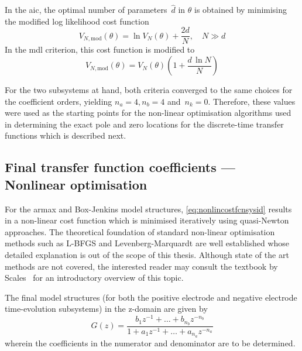 In  the \gls{aic},  the  optimal  number of  parameters~$\hat{d}$ in  $\theta$
is  obtained   by  minimising   the  modified   log  likelihood   cost  function
\begin{equation}
    V_{N,\text{mod}}(\theta) =  \ln V_N(\theta)  + \frac{2  d}{N}, \quad N \gg d
\end{equation}
In the \gls{mdl} criterion, this cost function is modified to
\begin{equation}
    V_{N,\text{mod}}(\theta) =  V_N(\theta)\left(1 + \frac{d\, \ln N}{N}  \right)
\end{equation}

For the two subsystems at hand, both  criteria converged to the same choices for
the coefficient orders,  yielding ${n_a = 4,  n_b = 4}$ and~${n_k  = 0}$. Therefore,
these values  were used as the  starting points for the  non-linear optimisation
algorithms  used in  determining  the  exact pole  and  zero  locations for  the
discrete-time transfer functions which is described next.

\subsection{Final transfer function coefficients --- Nonlinear optimisation}

For         the         \gls{armax}        and         Box-Jenkins         model
structures, \cref{eq:nonlincostfcnsysid} results  in a non-linear  cost function
which  is  minimised iteratively  using  quasi-Newton  approaches. The  theoretical
foundation  of  standard non-linear  optimisation  methods  such as  L-BFGS  and
Levenberg-Marquardt are  well established whose  detailed explanation is  out of
the scope of this thesis. Although state of the art methods are not covered, the
interested reader  may consult the  textbook by Scales~\cite{Scales1985}  for an
introductory overview of this topic.

The  final  model structures  (for  both  the  positive electrode  and  negative
electrode time-evolution subsystems) in the z-domain are given by
\begin{equation}
    G(z) = \frac{b_1z^{-1} + \dots + b_{n_b}z^{-{n_b}}}{1 + a_1z^{-1} + \dots + a_{n_a}z^{-{n_a}}}\label{eq:genericZtf}
\end{equation}
wherein the coefficients in the numerator and denominator are to be determined.

